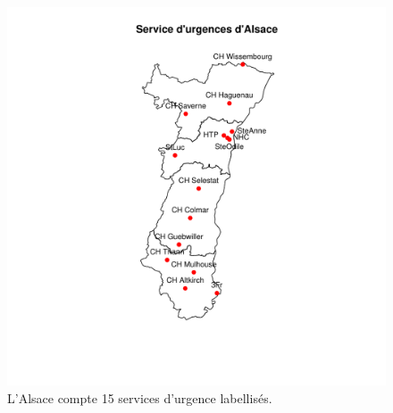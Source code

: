 \documentclass[12pt,english,french,twoside]{report}\usepackage[]{graphicx}\usepackage[]{color}
\makeatletter
\def\maxwidth{ %
  \ifdim\Gin@nat@width>\linewidth
    \linewidth
  \else
    \Gin@nat@width
  \fi
}
\newenvironment{knitrout}{}{} %
\makeatother
\begin{document}
\begin{figure}[ht]
 \centering
\begin{knitrout}
\color{fgcolor}
\includegraphics[width=\maxwidth]{figure/carte_sau_2} 

\end{knitrout}

 \caption{L'Alsace compte 15 services d'urgence labellisés.}
 \label{fig:75ans}
\end{figure}
\end{document}
